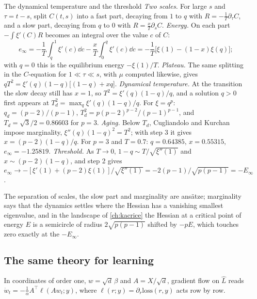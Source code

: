 \begin{refsection}
\begin{computation}{The dynamical temperature and the threshold}\label{comp:dmft:threshold}
\step \emph{Two scales.} For large $s$ and $\tau=t-s$, split $C(t,s)$ into a fast part, decaying from $1$ to $q$ with $R=-\frac1T\partial_\tau C$, and a slow part, decaying from $q$ to $0$ with $R=\frac xT\partial_sC$.
\step \emph{Energy.} On each part $-\int\xi'(C)R$ becomes an integral over the value $c$ of $C$:
\[
e_\infty=-\frac1T\int_q^1\xi'(c)\dd c-\frac xT\int_0^q\xi'(c)\dd c=-\frac1T\bigl[\xi(1)-(1-x)\xi(q)\bigr];
\]
with $q=0$ this is the equilibrium energy $-\xi(1)/T$.
\step \emph{Plateau.} The same splitting in the $C$-equation for $1\ll\tau\ll s$, with $\mu$ computed likewise, gives $qT^2=\xi'(q)(1-q)\bigl[(1-q)+xq\bigr]$.
\step \emph{Dynamical temperature.} At the transition the slow decay still has $x=1$, so $T^2=\xi'(q)(1-q)/q$, and a solution $q>0$ first appears at $T_d^2=\max_q\xi'(q)(1-q)/q$. For $\xi=q^p$: $q_d=(p-2)/(p-1)$, $T_d^2=p(p-2)^{p-2}/(p-1)^{p-1}$, and $T_d=\sqrt3/2=0.86603$ for $p=3$.
\step \emph{Aging.} Below $T_d$, Cugliandolo and Kurchan impose marginality, $\xi''(q)(1-q)^2=T^2$; with step 3 it gives $x=(p-2)(1-q)/q$. For $p=3$ and $T=0.7$: $q=0.64385$, $x=0.55315$, $e_\infty=-1.25819$.
\step \emph{Threshold.} As $T\to0$, $1-q\sim T/\sqrt{\xi''(1)}$ and $x\sim(p-2)(1-q)$, and step 2 gives $e_\infty\to-[\xi'(1)+(p-2)\xi(1)]/\sqrt{\xi''(1)}=-2(p-1)/\sqrt{p(p-1)}=-E_\infty$.
\end{computation}

The separation of scales, the slow part and marginality are ansätze; marginality says that the dynamics settles where the Hessian has a vanishing smallest eigenvalue, and in the landscape of \cref{ch:kacrice} the Hessian at a critical point of energy $E$ is a semicircle of radius $2\sqrt{p(p-1)}$ shifted by $-pE$, which touches zero exactly at the  $-E_\infty$.

\subsection{The same theory for learning}

In coordinates of order one, $w=\sqrt d\,\beta$ and $A=X/\sqrt d$, gradient flow on $\hat L$ reads $\dot w_t=-\frac1\alpha A^\top\ell(Aw_t;y)$, where $\ell(r;y)=\partial_r\mathrm{loss}(r,y)$ acts row by row.


\end{refsection}
